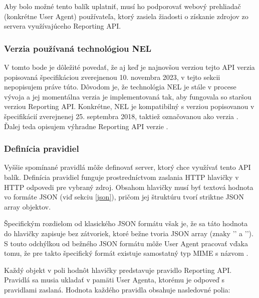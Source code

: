 Aby bolo možné tento balík uplatniť, musí ho podporovať webový prehliadač (konkrétne User Agent) používateľa, ktorý zasiela žiadosti o získanie zdrojov zo servera využívajúceho Reporting API.

\subsubsection{Verzia používaná technológiou NEL}

V tomto bode je dôležité povedať, že aj keď je najnovšou verziou tejto API verzia popisovaná špecifikáciou zverejnenou 10. novembra 2023, v tejto sekcii nepopisujem práve túto.
Dôvodom je, že technológia NEL je stále v procese vývoja a jej momentálna verzia je implementovaná tak, aby fungovala so staršou verziou Reporting API.
Konkrétne, NEL je kompatibilný s verziou popisovanou v špecifikácií zverejnenej 
25. septembra 2018, taktiež označovanou ako verzia \textbf{}.
Ďalej teda opisujem výhradne Reporting API verzie .

\subsubsection{Definícia pravidiel}

Vyššie spomínané pravidlá môže definovať server, ktorý chce využívať tento API balík. 
Definícia pravidiel funguje prostredníctvom zaslania HTTP hlavičky  v HTTP odpovedi pre vybraný zdroj.
Obsahom hlavičky  musí byť textová hodnota vo formáte JSON (viď sekciu \ref{json}), pričom jej štruktúru tvorí striktne JSON array objektov.

Špecifickým rozdielom od klasického JSON formátu však je, že sa táto hodnota do hlavičky
zapisuje bez zátvoriek, ktoré bežne tvoria JSON array (znaky '\code{[}' a '\code{]}').
S touto odchýlkou od bežného JSON formátu môže User Agent pracovať vďaka tomu, že pre takto špecifický formát existuje samostatný typ MIME s názvom . 

\pagebreak

Každý objekt v poli hodnôt hlavičky  predstavuje pravidlo Reporting API.
Pravidlá sa musia ukladať v pamäti User Agenta, ktorému je odpoveď s pravidlami zaslaná.
Hodnota každého pravidla obsahuje nasledovné polia: 

